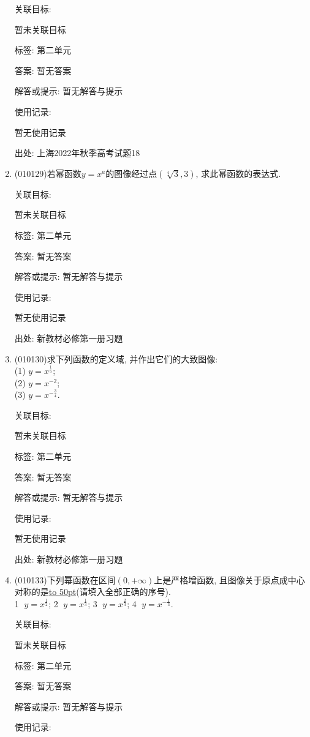\documentclass[10pt,a4paper]{article}
\newcommand{\blank}[1]{\underline{\hbox to #1pt{}}}
\begin{document}
\begin{enumerate}[1.]
关联目标:

暂未关联目标



标签: 第二单元

答案: 暂无答案

解答或提示: 暂无解答与提示

使用记录:

暂无使用记录


出处: 上海2022年秋季高考试题18
\item { (010129)}若幂函数$y=x^a$的图像经过点$(\sqrt[4]{3}, 3)$, 求此幂函数的表达式.


关联目标:

暂未关联目标



标签: 第二单元

答案: 暂无答案

解答或提示: 暂无解答与提示

使用记录:

暂无使用记录


出处: 新教材必修第一册习题
\item { (010130)}求下列函数的定义域, 并作出它们的大致图像:\\
(1) $y=x^\frac 15$;\\
(2) $y=x^{-2}$;\\
(3) $y=x^{-\frac 34}$.


关联目标:

暂未关联目标



标签: 第二单元

答案: 暂无答案

解答或提示: 暂无解答与提示

使用记录:

暂无使用记录


出处: 新教材必修第一册习题
\item { (010133)}下列幂函数在区间$(0, +\infty)$上是严格增函数, 且图像关于原点成中心对称的是\blank{50}(请填入全部正确的序号).\\
\textcircled{1} $y=x^\frac 12$; \textcircled{2} $y=x^\frac 13$; \textcircled{3} $y=x^\frac 23$; \textcircled{4} $y=x^{-\frac 13}$.


关联目标:

暂未关联目标



标签: 第二单元

答案: 暂无答案

解答或提示: 暂无解答与提示

使用记录:


\end{enumerate}
\end{document}
